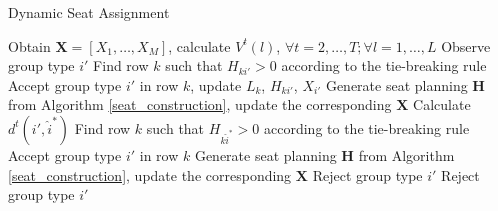 \begin{algorithm}[H]
  \caption{Dynamic Seat Assignment}
  Obtain $\bm{X} = [X_1, \ldots, X_M]$, calculate $V^{t}(l)$, $\forall t =2, \ldots, T; \forall l = 1, \ldots, L$\;
  {Observe group type ${i{'}}$\;
    {
    {Find row $k$ such that $H_{k{i{'}}} >0$ according to the tie-breaking rule\; 
    Accept group type $i{'}$ in row $k$, update $L_{k}$, $H_{k{i{'}}}$, $X_{i{'}}$\;
    {Generate seat planning $\bm{H}$ from Algorithm \ref{seat_construction}, update the corresponding $\bm{X}$\;}}
    {Calculate $d^{t}({i{'}}, \hat{i}^{*})$\;
    {Find row $k$ such that $H_{k \hat{i}^{*}} > 0$ according to the tie-breaking rule\;
     Accept group type $i{'}$ in row $k$\;
    Generate seat planning $\bm{H}$ from Algorithm \ref{seat_construction}, update the corresponding $\bm{X}$\;}
    {Reject group type ${i{'}}$\;}}}
    {Reject group type ${i{'}}$\;}}
\end{algorithm}
